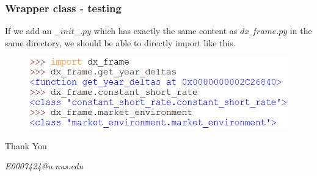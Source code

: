 \documentclass{beamer}
\begin{document}
\begin{frame}
\frametitle{Wrapper class - testing}
If we add an $\_\_init\_\_.py$ which has exactly the same content as $dx\_frame.py$ in the same directory, we should be able to directly import like this.
\begin{figure}[H]
	\includegraphics[scale=0.48]{import_wrapper_class_example.png}
\end{figure}
\end{frame}

\begin{frame}
\Huge{\centerline{Thank You}}
\begin{center}
\begin{normalsize}
\emph{E0007424@u.nus.edu}
\end{normalsize}
\end{center}
\end{frame}

\end{document}
